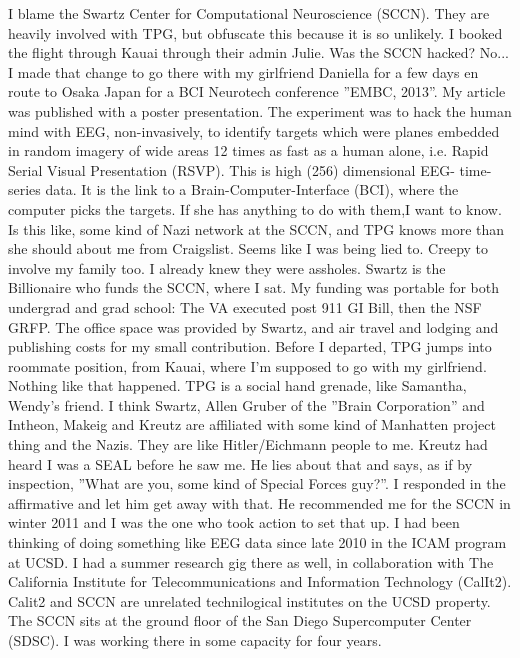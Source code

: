 \documentclass{article}
\begin{document}
\begin{multicols}{2}
I blame the Swartz Center for Computational Neuroscience (SCCN). They are heavily involved with TPG, but obfuscate this because it is so unlikely. I booked the flight through Kauai through their admin Julie. Was the SCCN hacked? No... I made that change to go there with my girlfriend Daniella for a few days en route to Osaka Japan for a BCI Neurotech conference ''EMBC, 2013''. My article was published with a poster presentation. The experiment was to hack the human mind with EEG, non-invasively, to identify targets which were planes embedded in random imagery of wide areas 12 times as fast as a human alone, i.e. Rapid Serial Visual Presentation (RSVP). This is high (256) dimensional EEG- time-series data. It is the link to a Brain-Computer-Interface (BCI), where the computer picks the targets. If she has anything to do with them,I want to know. Is this like, some kind of Nazi network at the SCCN, and TPG knows more than she should about me from Craigslist. Seems like I was being lied to. Creepy to involve my family too. I already knew they were assholes. Swartz is the Billionaire who funds the SCCN, where I sat. My funding was portable for both undergrad and grad school: The VA executed post 911 GI Bill, then the NSF GRFP. The office space was provided by Swartz, and air travel and lodging and publishing costs for my small contribution. Before I departed, TPG jumps into roommate position, from Kauai, where I'm supposed to go with my girlfriend. Nothing like that happened. TPG is a social hand grenade, like Samantha, Wendy's friend. I think Swartz, Allen Gruber of the ''Brain Corporation'' and Intheon, Makeig and Kreutz are affiliated with some kind of Manhatten project thing and the Nazis. They are like Hitler/Eichmann people to me. Kreutz had heard I was a SEAL before he saw me. He lies about that and says, as if by inspection, ''What are you, some kind of Special Forces guy?''. I responded in the affirmative and let him get away with that. He recommended me for the SCCN in winter 2011 and I was the one who took action to set that up. I had been thinking of doing something like EEG data since late 2010 in the ICAM program at UCSD. I had a summer research gig there as well, in collaboration with The California Institute for Telecommunications and Information Technology (CalIt2). Calit2 and SCCN are unrelated technilogical institutes on the UCSD property. The SCCN sits at the ground floor of the San Diego Supercomputer Center (SDSC). I was working there in some capacity for four years. 


\end{multicols}
\end{document}
